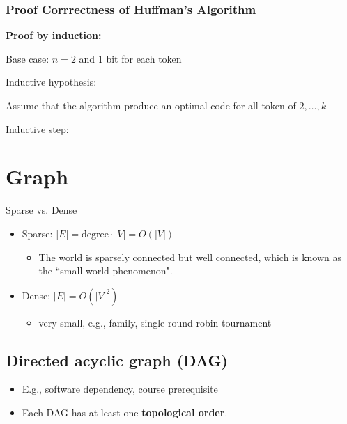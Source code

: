 \documentclass[12pt,a4paper]{article}
\begin{document}
\subsubsection*{Proof Corrrectness of Huffman's Algorithm}

\textbf{Proof by induction:}

Base case: $n=2$ and 1 bit for each token

Inductive hypothesis: 

Assume that the algorithm produce an optimal code for all token of $2,\dots,k$

Inductive step:

\section*{Graph}

Sparse vs. Dense

\begin{itemize}
    \item Sparse: $|E| = \text{degree} \cdot |V| = O(|V|)$
    \begin{itemize}
        \item The world is sparsely connected but well connected, which is known as the ``small world phenomenon". 
    \end{itemize}
    \item Dense: $|E| = O(|V|^2)$
    \begin{itemize}
        \item very small, e.g., family, single round robin tournament
    \end{itemize}
\end{itemize}

\subsection*{Directed acyclic graph (DAG)}

\begin{itemize}
    \item E.g., software dependency, course prerequisite
    \item Each DAG has at least one \textbf{topological order}.
\end{itemize}
\end{document}
